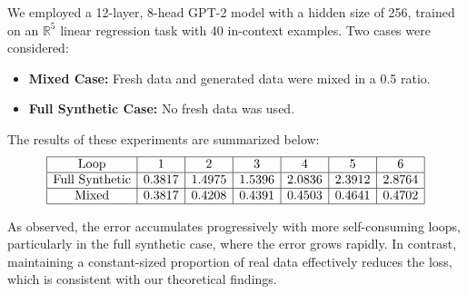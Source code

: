 We employed a 12-layer, 8-head GPT-2 model with a hidden size of 256, trained on an \(\mathbb{R}^5\) linear regression task with 40 in-context examples. Two cases were considered:
\begin{itemize}
    \item \textbf{Mixed Case:} Fresh data and generated data were mixed in a 0.5 ratio.
    \item \textbf{Full Synthetic Case:} No fresh data was used.
\end{itemize}

The results of these experiments are summarized below:
\[
\begin{array}{|c|c|c|c|c|c|c|}
\hline
\text{Loop} & 1 & 2 & 3 & 4 & 5 & 6\\
\hline
\text{Full Synthetic} & 0.3817 & 1.4975 & 1.5396 & 2.0836 & 2.3912 & 2.8764\\
\hline
\text{Mixed} & 0.3817 & 0.4208 & 0.4391 & 0.4503 & 0.4641 & 0.4702\\
\hline
\end{array}
\]

As observed, the error accumulates progressively with more self-consuming loops, particularly in the full synthetic case, where the error grows rapidly. In contrast, maintaining a constant-sized proportion of real data effectively reduces the loss, which is consistent with our theoretical findings.